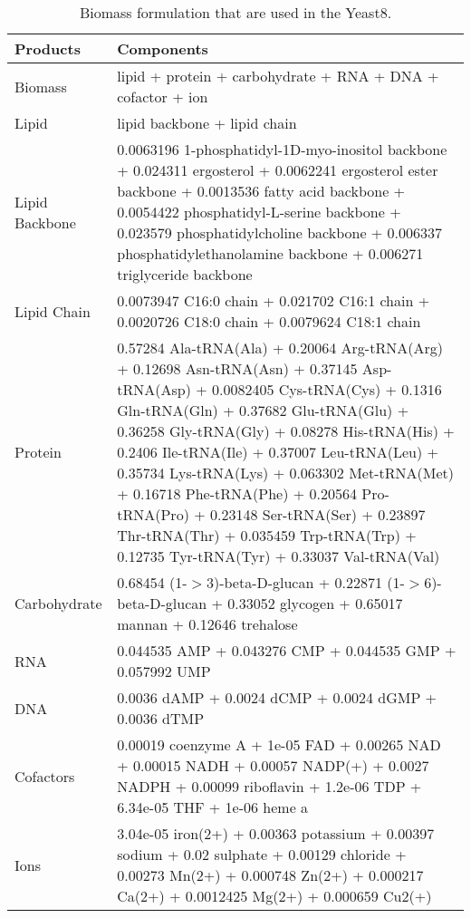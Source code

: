 \begin{table}[H]
\small
\caption[Biomass formulation that are used in the Yeast8]{Biomass formulation that are used in the Yeast8.}
\begin{center}
  \begin{tabular}{|p{3cm}|p{11.5cm}|}
  \hline
  \textbf{Products} & \textbf{Components} \\ \hline
  Biomass      & lipid + protein + carbohydrate + RNA + DNA + cofactor + ion \\ \hline
    Lipid   & lipid backbone + lipid chain \\ \hline
  Lipid Backbone  & 0.0063196 1-phosphatidyl-1D-myo-inositol backbone +
  0.024311 ergosterol + 0.0062241 ergosterol ester backbone  +
  0.0013536 fatty acid backbone +
  0.0054422 phosphatidyl-L-serine backbone +
  0.023579 phosphatidylcholine backbone  +
  0.006337 phosphatidylethanolamine backbone +
  0.006271 triglyceride backbone \\ \hline
  Lipid Chain  & 0.0073947 C16:0 chain +
  0.021702 C16:1 chain +
  0.0020726 C18:0 chain +
  0.0079624 C18:1 chain \\ \hline
  Protein      & 0.57284 Ala-tRNA(Ala) +
  0.20064 Arg-tRNA(Arg) +
  0.12698 Asn-tRNA(Asn) +
  0.37145 Asp-tRNA(Asp) +
  0.0082405 Cys-tRNA(Cys) +
  0.1316 Gln-tRNA(Gln) +
  0.37682 Glu-tRNA(Glu) +
  0.36258 Gly-tRNA(Gly) +
  0.08278 His-tRNA(His) +
  0.2406 Ile-tRNA(Ile) +
  0.37007 Leu-tRNA(Leu) +
  0.35734 Lys-tRNA(Lys) +
  0.063302 Met-tRNA(Met) +
  0.16718 Phe-tRNA(Phe) +
  0.20564 Pro-tRNA(Pro) +
  0.23148 Ser-tRNA(Ser) +
  0.23897 Thr-tRNA(Thr) +
  0.035459 Trp-tRNA(Trp) +
  0.12735 Tyr-tRNA(Tyr) +
  0.33037 Val-tRNA(Val) \\ \hline
  Carbohydrate   & 0.68454 (1-$>$3)-beta-D-glucan +
  0.22871 (1-$>$6)-beta-D-glucan +
  0.33052 glycogen +
  0.65017 mannan +
  0.12646 trehalose \\ \hline
  RNA   & 0.044535 AMP +
  0.043276 CMP +
  0.044535 GMP +
  0.057992 UMP \\ \hline
  DNA   & 0.0036 dAMP +
  0.0024 dCMP +
  0.0024 dGMP +
  0.0036 dTMP \\ \hline
  Cofactors   & 0.00019 coenzyme A +
  1e-05 FAD +
  0.00265 NAD +
  0.00015 NADH +
  0.00057 NADP(+) +
  0.0027 NADPH +
  0.00099 riboflavin +
  1.2e-06 TDP +
  6.34e-05 THF +
  1e-06 heme a \\ \hline
  Ions   & 3.04e-05 iron(2+) +
  0.00363 potassium +
  0.00397 sodium +
  0.02 sulphate +
  0.00129 chloride +
  0.00273 Mn(2+)  +
  0.000748 Zn(2+) +
  0.000217 Ca(2+) +
  0.0012425 Mg(2+) +
  0.000659 Cu2(+) \\ \hline

  \end{tabular}
\label{table:biomass_coefficients}
\end{center}
\end{table}
